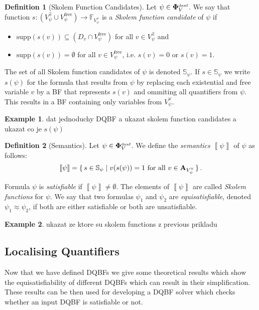 \documentclass[
  digital, %
  twoside, %
  table,   %
  nolof,     %
  nolot,     %
]{fithesis3}
\let\setbuilder\set
\newcommand{\simpleset}[1]{\{{#1}\}}
\renewcommand{\set}[1]{\normalexpandarg\IfSubStr{#1}{|}{\setbuilder{#1}}{\simpleset{#1}}}
\theoremstyle{definition}
\newtheorem{definition}{Definition}
\newtheorem{example}{Example}
\theoremstyle{remark}
\newcommand{\seman}[1]{\left\llbracket {#1} \right\rrbracket}
\newcommand{\DQBF}[1]{\mathbf{\Phi}_{#1}^{\text{\tiny dnnf}}}
\newcommand{\valtns}[1]{\mathbf{A}_{#1}}
\newcommand{\BFuncs}[1]{\mathbb{F}_{#1}}
\newcommand{\evars}[1]{V_{#1}^{\exists}}
\newcommand{\uvars}[1]{V_{#1}^{\forall}}
\newcommand{\fvars}[1]{V_{#1}^{\text{free}}}
\newcommand{\supp}[1]{\text{supp}(#1)}
\newcommand{\Scands}[1]{\mathbb{S}_{#1}}
\begin{document}
\begin{definition}[Skolem Function Candidates]
  Let $\psi \in \DQBF{V}$. We say that function $s\colon (\evars{\psi} \cup \fvars{\psi}) \to \BFuncs{\uvars{\psi}}$ is a \emph{Skolem function candidate} of $\psi$ if
  \begin{itemize}
      \item $\supp{s(v)} \subseteq (D_v \cap \fvars{\psi})$ for all $v \in \evars{\psi}$ and
      \item $\supp{s(v)} = \emptyset$ for all $v \in \fvars{\psi}$, i.e. $s(v)=0$ or $s(v)=1$.
  \end{itemize}
\end{definition}
The set of all Skolem function candidates of $\psi$ is denoted $\Scands{\psi}$. If $s \in \Scands{\psi}$ we write $s(\psi)$ for the formula that results from $\psi$ by replacing each existential and free variable $v$ by a BF that represents $s(v)$ and ommiting all quantifiers from $\psi$. This results in a BF containing only variables from $\uvars{\psi}$.
\begin{example}
dat jednoduchy DQBF a ukazat skolem function candidates a ukazat co je $s(\psi)$
\end{example}
\begin{definition}[Semantics]
  Let $\psi \in \DQBF{V}$. We define the \emph{semantics} $\seman{\psi}$ of $\psi$ as follows:
  \[\seman{\psi} = \set{s \in \Scands{\psi} | v(s(\psi))=1 \text{ for all } v \in \valtns{\uvars{\psi}}}.\]
\end{definition}
Formula $\psi$ is \emph{satisfiable} if $\seman{\psi} \not= \emptyset$. The elements of $\seman{\psi}$ are called \emph{Skolem functions} for $\psi$. We say that two formulas $\psi_1$ and $\psi_2$ are \emph{equisatisfiable}, denoted $\psi_1 \approx \psi_2$, if both are either satisfiable or both are unsatisfiable.
\begin{example}
ukazat ze ktore su skolem functions z previous prikladu
\end{example}

\subsection{Localising Quantifiers}
Now that we have defined DQBFs we give some theoretical results which show the equisatisfiability of different DQBFs which can result in their simplification. These results can be then used for developing a DQBF solver which checks whether an input DQBF is satisfiable or not.
\end{document}
